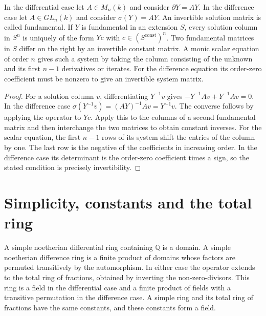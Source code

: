 \begin{lemma}
\label{res:PV02}
In the differential case let \(A\in M_n(k)\) and consider
\(\partial Y=AY\). In the difference case let \(A\in GL_n(k)\)
and consider \(\sigma(Y)=AY\). An invertible solution matrix is
called fundamental. If \(Y\) is fundamental in an extension \(S\),
every solution column in \(S^n\) is uniquely of the form \(Yc\) with
\(c\in(S^{\mathrm{const}})^n\). Two fundamental matrices in \(S\)
differ on the right by an invertible constant matrix.
A monic scalar equation of order \(n\) gives such a system by taking
the column consisting of the unknown and its first \(n-1\) derivatives
or iterates. For the difference equation its order-zero coefficient
must be nonzero to give an invertible system matrix.
\end{lemma}

\begin{proof}
For a solution column \(v\), differentiating \(Y^{-1}v\) gives
\(-Y^{-1}Av+Y^{-1}Av=0\). In the difference case
\(\sigma(Y^{-1}v)=(AY)^{-1}Av=Y^{-1}v\).
The converse follows by applying the operator to \(Yc\).
Apply this to the columns of a second fundamental matrix and then
interchange the two matrices to obtain constant inverses.
For the scalar equation, the first \(n-1\) rows of its system shift the
entries of the column by one. The last row is the negative of the
coefficients in increasing order. In the difference case its determinant
is the order-zero coefficient times a sign, so the stated condition
is precisely invertibility.
\end{proof}

\section{Simplicity, constants and the total ring}

\begin{lemma}
\label{res:PV03}
A simple noetherian differential ring containing \(\mathbb Q\) is a
domain. A simple noetherian difference ring is a finite product of
domains whose factors are permuted transitively by the automorphism.
In either case the operator extends to the total ring of fractions,
obtained by inverting the non-zero-divisors. This ring is a field in
the differential case and a finite product of fields with a transitive
permutation in the difference case. A simple ring and its total ring
of fractions have the same constants, and these constants form a field.
\end{lemma}

